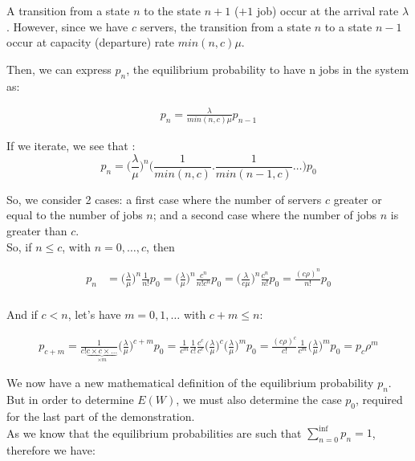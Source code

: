\documentclass{article}
\begin{document}
    A transition from a state $n$ to the state $n+1$ ($+1$ job) occur at the arrival rate $\lambda$.
    However, since we have $c$ servers, the transition from a state $n$ to a state $n-1$ occur at capacity (departure) rate $min(n, c) \mu$.

    Then, we can express $p_n$, the equilibrium probability to have n jobs in the system as:

    \begin{align}
        p_n = \frac{\lambda}{min(n, c) \mu} p_{n - 1}
    \end{align}

    If we iterate, we see that :
    \begin{equation}
        p_n = \Big(\frac{\lambda}{\mu} \Big)^n \Big(\frac{1}{min(n, c)} .  \frac{1}{min(n - 1, c)} \ldots \Big) p_0
    \end{equation}

    So, we consider 2 cases: a first case where the number of servers $c$ greater or equal to the number of jobs $n$; and a second case where the number of jobs $n$ is greater than $c$.\\
    So, if $n \leq c$, with $n = 0, \ldots, c$, then

    \begin{align}
        p_n &= \Big( \frac{\lambda}{\mu} \Big)^n \frac{1}{n!} p_0
        = \Big( \frac{\lambda}{\mu} \Big)^n \frac{c^n}{n! c^n} p_0
        = \Big( \frac{\lambda}{c \mu} \Big)^n \frac{c^n}{n!} p_0
        = \frac{(c \rho)^n}{n!} p_0\\
    \end{align}

    And if $c < n$, let's have $m = 0, 1, \ldots$ with $c + m \leq n$:

    \begin{align}
        p_{c + m} = \frac{1}{c! \underbrace{c \times c \times \ldots}_{\times m}} \Big( \frac{\lambda}{\mu} \Big)^{c + m} p_0
        = \frac{1}{c^m} \frac{1}{c!} \frac{c^c}{c^c} \Big( \frac{\lambda}{\mu} \Big)^c \Big( \frac{\lambda}{\mu} \Big)^m p_0
        = \frac{(c \rho)^c}{c!} \frac{1}{c^m} \Big( \frac{\lambda}{\mu} \Big)^m p_0
        = p_c \rho^m
        \label{eq:p_c_plus_m}
    \end{align}

    We now have a new mathematical definition of the equilibrium probability $p_n$.
    But in order to determine $E(W)$, we must also determine the case $p_0$, required for the last part of the demonstration.\\
    As we know that the equilibrium probabilities are such that $\sum_{n=0}^{\inf} p_n = 1$, therefore we have:
\end{document}
